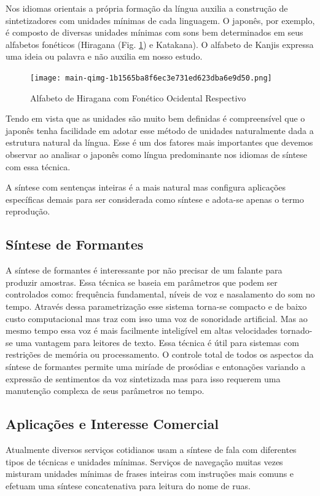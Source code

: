 Nos idiomas orientais a própria formação da língua auxilia a construção de sintetizadores com unidades mínimas de cada linguagem. O japonês, por exemplo, é composto de diversas unidades mínimas com sons bem determinados em seus alfabetos fonéticos (Hiragana (Fig. \ref{fig:hiragana}) e Katakana). O alfabeto de Kanjis expressa uma ideia ou palavra e não auxilia em nosso estudo.

\begin{figure}[ht]
    \centering
    \texttt{[image: main-qimg-1b1565ba8f6ec3e731ed623dba6e9d50.png]}
    \caption{Alfabeto de Hiragana com Fonético Ocidental Respectivo}
    \label{fig:hiragana}
\end{figure}

Tendo em vista que as unidades são muito bem definidas é compreensível que o japonês tenha facilidade em adotar esse método de unidades naturalmente dada a estrutura natural da língua. Esse é um dos fatores mais importantes que devemos observar ao analisar o japonês como língua predominante nos idiomas de síntese com essa técnica.

A síntese com sentenças inteiras é a mais natural mas configura aplicações específicas demais para ser considerada como síntese e adota-se apenas o termo reprodução.

\subsection{Síntese de Formantes}
A síntese de formantes é interessante por não precisar de um falante para produzir amostras. Essa técnica se baseia em parâmetros que podem ser controlados como: frequência fundamental, níveis de voz e nasalamento do som no tempo. Através dessa parametrização esse sistema torna-se compacto e de baixo custo computacional mas traz com isso uma voz de sonoridade artificial. Mas ao mesmo tempo essa voz é mais facilmente inteligível em altas velocidades tornado-se uma vantagem para leitores de texto. Essa técnica é útil para sistemas com restrições de memória ou processamento. O controle total de todos os aspectos da síntese de formantes permite uma miríade de prosódias e entonações variando a expressão de sentimentos da voz sintetizada mas para isso requerem uma manutenção complexa de seus parâmetros no tempo.

\subsection{Aplicações e Interesse Comercial}
Atualmente diversos serviços cotidianos usam a síntese de fala com diferentes tipos de técnicas e unidades mínimas. Serviços de navegação muitas vezes misturam unidades mínimas de frases inteiras com instruções mais comuns e efetuam uma síntese concatenativa para leitura do nome de ruas. 

